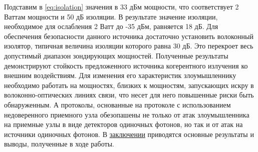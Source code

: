 Подставим в \ref{eq:isolation} значения в 33 дБм мощности, что соответствует 2 Ваттам мощности и 50 дБ изоляции. В результате значение изоляции, необходимое для ослабления 2 Ватт до -35 дБм, равняется 18 дБ. Для обеспечения безопасности данного источника достаточно установить волоконный изолятор, типичная величина изоляции которого равна 30 дБ. Это перекроет весь допустимый диапазон зондирующих мощностей. 
\newline Полученные результаты демонстрируют стойкость предложенного источника когерентного излучения ко внешним воздействиям. Для изменения его характеристик злоумышленнику необходимо работать на мощностях, близких к мощностям, запускающих искру в волоконно-оптических линиях связи, что несет для него повышенные риски быть обнаруженным. А протоколы, основанные на протоколе с использованием недоверенного приемного узла обезопашены не только от атак злоумышленника на приемные узлы в виде детекторов одиночных фотонов, но так и от атак на источники одиночных фотонов.
В \underline{заключении} приводятся основные результаты и выводы, полученные в ходе работы.
